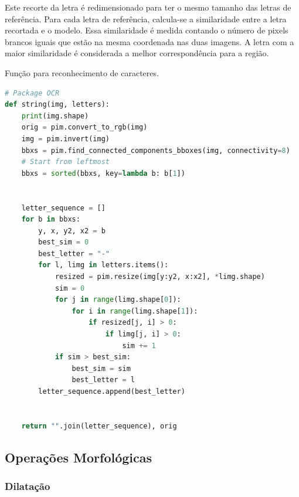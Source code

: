 \documentclass[english, 
               brazil, 
               bsc] %
               {dcomp-abntex2}
\begin{document}
Este recorte da letra é redimensionado para ter o mesmo tamanho das letras de referência. Para cada letra de referência, calcula-se a similaridade entre a letra recortada e o modelo. Essa similaridade é medida contando o número de pixels brancos iguais que estão na mesma coordenada nas duas imagens. A letra com a maior similaridade é considerada a melhor correspondência para a região.




\begin{codigo}[h]
  \caption{\small Função para reconhecimento de caracteres.}
 \label{cod-ocr}
\begin{lstlisting}[language=python]
# Package OCR
def string(img, letters):
    print(img.shape)
    orig = pim.convert_to_rgb(img)
    img = pim.invert(img)
    bbxs = pim.find_connected_components_bboxes(img, connectivity=8)
    # Start from leftmost
    bbxs = sorted(bbxs, key=lambda b: b[1])


    letter_sequence = []
    for b in bbxs:
        y, x, y2, x2 = b
        best_sim = 0
        best_letter = "-"
        for l, limg in letters.items():
            resized = pim.resize(img[y:y2, x:x2], *limg.shape)
            sim = 0
            for j in range(limg.shape[0]):
                for i in range(limg.shape[1]):
                    if resized[j, i] > 0:
                        if limg[j, i] > 0:
                            sim += 1
            if sim > best_sim:
                best_sim = sim
                best_letter = l
        letter_sequence.append(best_letter)


    return "".join(letter_sequence), orig
\end{lstlisting}
\end{codigo}












\subsection{Operações Morfológicas} \label{sec-morph}
\subsubsection{Dilatação}
\end{document}
